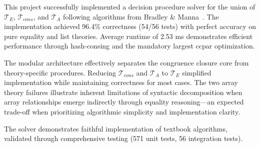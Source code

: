 \documentclass[11pt,a4paper]{article}
\begin{document}
This project successfully implemented a decision procedure solver for the union of $\mathcal{T}_E$, $\mathcal{T}_{cons}$, and $\mathcal{T}_A$ following algorithms from Bradley \& Manna~\cite{bradley2007calculus}. The implementation achieved 96.4\% correctness (54/56 tests) with perfect accuracy on pure equality and list theories. Average runtime of 2.53 ms demonstrates efficient performance through hash-consing and the mandatory largest ccpar optimization.

The modular architecture effectively separates the congruence closure core from theory-specific procedures. Reducing $\mathcal{T}_{cons}$ and $\mathcal{T}_A$ to $\mathcal{T}_E$ simplified implementation while maintaining correctness for most cases. The two array theory failures illustrate inherent limitations of syntactic decomposition when array relationships emerge indirectly through equality reasoning—an expected trade-off when prioritizing algorithmic simplicity and implementation clarity.

The solver demonstrates faithful implementation of textbook algorithms, validated through comprehensive testing (571 unit tests, 56 integration tests).



\end{document}
